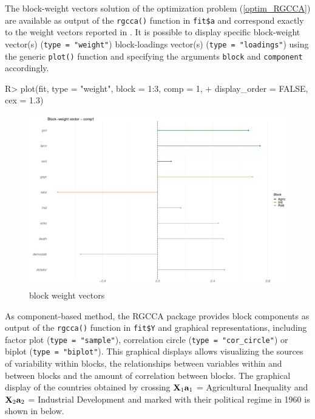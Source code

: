 \documentclass[
]{jss}
\begin{document}
\normalsize

The block-weight vectors solution of the optimization problem
(\ref{optim_RGCCA}) are available as output of the \texttt{rgcca()}
function in \texttt{fit\$a} and correspond exactly to the weight vectors
reported in \citep[see Figure 5]{Tenenhaus2011}. It is possible to
display specific block-weight vector(s) (\texttt{type\ =\ "weight"})
block-loadings vector(s) (\texttt{type\ =\ "loadings"}) using the
generic \texttt{plot()} function and specifying the arguments
\texttt{block} and \texttt{component} accordingly.

\footnotesize

\begin{CodeChunk}
\begin{CodeInput}
R> plot(fit, type = "weight", block = 1:3, comp = 1, 
+      display_order = FALSE, cex = 1.3)
\end{CodeInput}
\begin{figure}[H]

{\centering \includegraphics{RGCCA_21022023_files/figure-latex/unnamed-chunk-7-1} 

}

\caption[block weight vectors]{block weight vectors}\label{fig:unnamed-chunk-7}
\end{figure}
\end{CodeChunk}

\normalsize

As component-based method, the RGCCA package provides block components
as output of the \texttt{rgcca()} function in \texttt{fit\$Y} and
graphical representations, including factor plot
(\texttt{type\ =\ "sample"}), correlation circle
(\texttt{type\ =\ "cor\_circle"}) or biplot
(\texttt{type\ =\ "biplot"}). This graphical displays allows visualizing
the sources of variability within blocks, the relationships between
variables within and between blocks and the amount of correlation
between blocks. The graphical display of the countries obtained by
crossing \(\mathbf{X}_1 \mathbf{a}_1\) = Agricultural Inequality and \(\mathbf{X}_2 \mathbf{a}_2\)
= Industrial Development and marked with their political regime in 1960
is shown in below.
\end{document}
